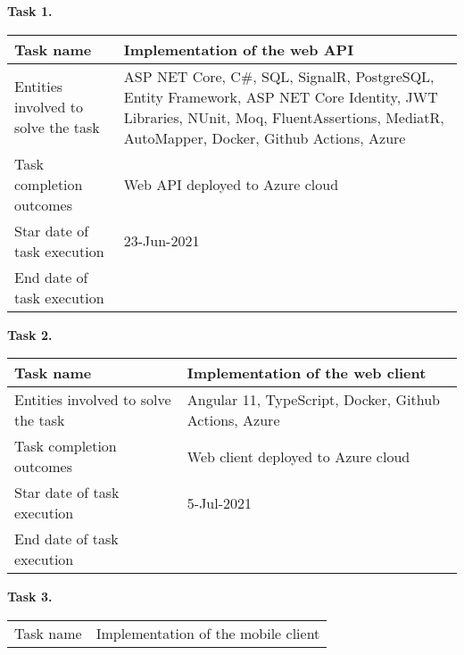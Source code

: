 \begin{description}
    \item \hspace*{8mm}\textbf{Task 1.}\\
    \begin{tabular}{|p{}|p{}|}
        \hline
        Task name                   & Implementation of the web API   \\
        \hline
        Entities involved to solve the task & ASP NET Core, C\#, SQL, SignalR, PostgreSQL, Entity Framework, ASP NET Core Identity,
        JWT Libraries, NUnit, Moq, FluentAssertions, MediatR, AutoMapper, Docker, Github Actions, Azure \\
        \hline
        Task completion outcomes    & Web API deployed to Azure cloud \\
        \hline
        Star date of task execution & 23-Jun-2021                     \\
        \hline
        End date of task execution  &                                 \\
        \hline
    \end{tabular}
    \item \hspace*{8mm}\textbf{Task 2.}\\
    \begin{tabular}{|p{}|p{}|}
        \hline
        Task name                           & Implementation of the web client                      \\
        \hline
        Entities involved to solve the task & Angular 11, TypeScript, Docker, Github Actions, Azure \\
        \hline
        Task completion outcomes            & Web client deployed to Azure cloud                    \\
        \hline
        Star date of task execution         & 5-Jul-2021                                            \\
        \hline
        End date of task execution          &                                                       \\
        \hline
    \end{tabular}
    \item \hspace*{8mm}\textbf{Task 3.}\\
    \begin{tabular}{|p{}|p{}|}
        \hline
        Task name                           & Implementation of the mobile client \\

\end{tabular}
\end{description}
